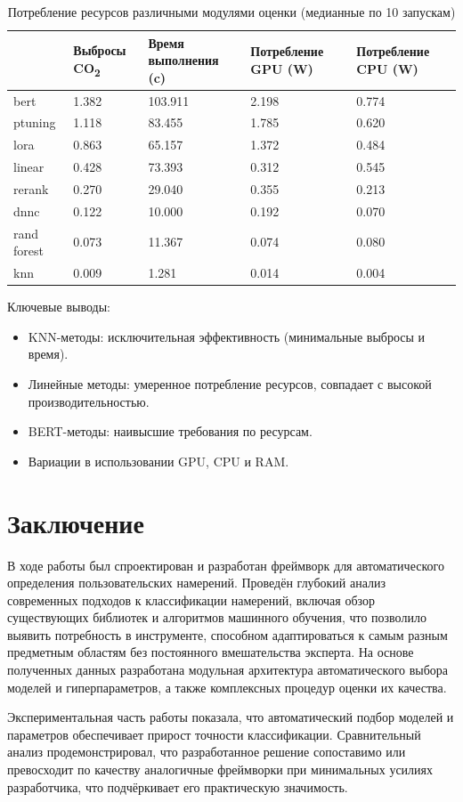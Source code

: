 \documentclass[14pt,a4paper,oneside,openany]{extbook}
\begin{document}
\begin{table}[h!]
\caption{\label{tbl:resources}Потребление ресурсов различными модулями оценки (медианные по 10 запускам)}
\centering
\begin{tabular}{|p{2cm}|p{2cm}|p{2cm}|p{3cm}|p{3cm}|}
\hline
 & Выбросы CO\textsubscript{2} & Время выполнения (c) & Потребление GPU (W) & Потребление CPU (W)\\
\hline
bert & 1.382 & 103.911 & 2.198 & 0.774\\
\hline
ptuning & 1.118 & 83.455 & 1.785 & 0.620\\
\hline
lora & 0.863 & 65.157 & 1.372 & 0.484\\
\hline
linear & 0.428 & 73.393 & 0.312 & 0.545\\
\hline
rerank & 0.270 & 29.040 & 0.355 & 0.213\\
\hline
dnnc & 0.122 & 10.000 & 0.192 & 0.070\\
\hline
rand forest & 0.073 & 11.367 & 0.074 & 0.080\\
\hline
knn & 0.009 & 1.281 & 0.014 & 0.004\\
\hline
\end{tabular}
\end{table}

Ключевые выводы:
\begin{itemize}
\item KNN-методы: исключительная эффективность (минимальные выбросы и время).
\item Линейные методы: умеренное потребление ресурсов, совпадает с высокой производительностью.
\item BERT-методы: наивысшие требования по ресурсам.
\item Вариации в использовании GPU, CPU и RAM.
\end{itemize}
\chapter*{Заключение}
\label{sec:orgcfc073a}
В ходе работы был спроектирован и разработан фреймворк для автоматического определения пользовательских намерений. Проведён глубокий анализ современных подходов к классификации намерений, включая обзор существующих библиотек и алгоритмов машинного обучения, что позволило выявить потребность в инструменте, способном адаптироваться к самым разным предметным областям без постоянного вмешательства эксперта. На основе полученных данных разработана модульная архитектура автоматического выбора моделей и гиперпараметров, а также комплексных процедур оценки их качества.

Экспериментальная часть работы показала, что автоматический подбор моделей и параметров обеспечивает прирост точности классификации. Сравнительный анализ продемонстрировал, что разработанное решение сопоставимо или превосходит по качеству аналогичные фреймворки при минимальных усилиях разработчика, что подчёркивает его практическую значимость.

\printbibliography[title=СПИСОК\spaceИСПОЛЬЗОВАНЫХ\spaceИСТОЧНИКОВ]
\end{document}
